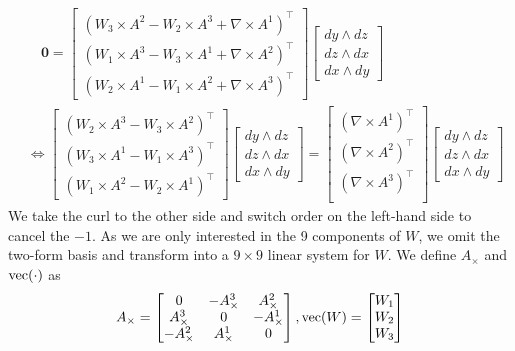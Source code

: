 \documentclass[../thesis.tex]{subfiles}
\begin{document}
\begin{align*}
  & \hspace{1em}\bm{0} = \begin{bmatrix}
    (W_3 \times A^2 - W_2 \times A^3 + \nabla \times A^1)^{\top} \\
    (W_1 \times A^3 - W_3 \times A^1+ \nabla \times A^2)^{\top} \\
    (W_2 \times A^1 - W_1 \times A^2 + \nabla \times A^3)^{\top}
  \end{bmatrix}\begin{bmatrix}
    dy \wedge dz \\ dz \wedge dx \\ dx \wedge dy
  \end{bmatrix} \\
  & \iff 
  \begin{bmatrix}
    (W_2 \times A^3 - W_3 \times A^2)^{\top}  \\ 
    (W_3 \times A^1 - W_1 \times A^3)^{\top}  \\
    (W_1 \times A^2 - W_2 \times A^1)^{\top}
  \end{bmatrix}
  \begin{bmatrix}
    dy \wedge dz \\ dz \wedge dx \\ dx \wedge dy
  \end{bmatrix}
  =
  \begin{bmatrix}
    (\nabla \times A^1)^{\top} \\
    (\nabla \times A^2)^{\top} \\
    (\nabla \times A^3)^{\top} \\
  \end{bmatrix}
  \begin{bmatrix}
    dy \wedge dz \\ dz \wedge dx \\ dx \wedge dy
  \end{bmatrix}
\end{align*}
We take the curl to the other side and switch order on the left-hand side to cancel the $-1$.
As we are only interested in the 9 components of $W$, we omit the
two-form basis and transform into a $9\times9$ linear system for $W$.
We define $A_{\times}$ and $\operatorname{vec}(\cdot)$ as
$$A_{\times} = \begin{bmatrix}
  0 & -A^3_{\times} & A^2_{\times} \\
  A^3_{\times} & 0 & -A^1_{\times} \\
  -A^2_{\times} & A^1_{\times} & 0
\end{bmatrix},
\operatorname{vec}(W)= \begin{bmatrix}
  W_1 \\ W_2 \\ W_3
\end{bmatrix}$$
\end{document}

